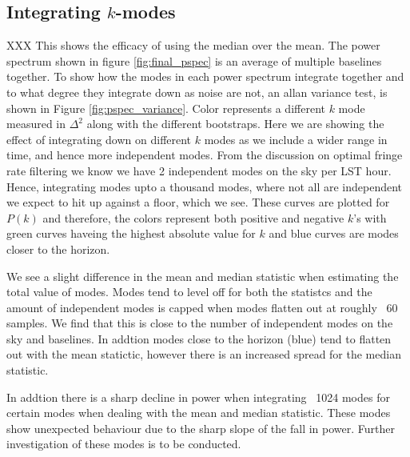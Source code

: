 \documentclass[twocolumn,numberedappendix]{emulateapj} \shorttitle{PSA64}
\begin{document}
\subsection{Integrating $k$-modes}
XXX This shows the efficacy of using the median over the mean.
The power spectrum shown in figure \ref{fig:final_pspec} is an average of
multiple baselines together. To show how the modes in each power spectrum
integrate together and to what degree they integrate down as noise are not, an
allan variance test, is shown in Figure \ref{fig:pspec_variance}. Color
represents a different $k$ mode measured in $\Delta^{2}$ along with the
different bootstraps. Here we are showing the effect of integrating down on
different $k$ modes as we include a wider range in time, and hence more
independent modes. From the discussion on optimal fringe rate filtering we know
we have 2 independent modes on the sky per LST hour. Hence, integrating modes
upto a thousand modes, where not all are independent we expect to hit up against
a floor, which we see. These curves are plotted for $P(k)$ and therefore, the
colors represent both positive and negative $k$'s with green curves haveing the
highest absolute value for $k$ and blue curves are modes closer to the horizon.


We see a slight difference in the mean and median statistic when estimating the
total value of modes. Modes tend to level off for both the statistcs and the
amount of independent modes is capped when modes flatten out at roughly ~60
samples. We find that this is close to the number of independent modes on the
sky and baselines. In addtion modes close to the horizon (blue) tend to flatten
out with the mean statictic, however there is an increased spread for the median
statistic. 

In addtion there is a sharp decline in power when integrating ~1024 modes for
certain modes when dealing with the mean and median statistic. These modes show
unexpected behaviour due to the sharp slope of the fall in power. Further
investigation of these modes is to be conducted.
%


%
%
%
%
%
%
%
\end{document}
